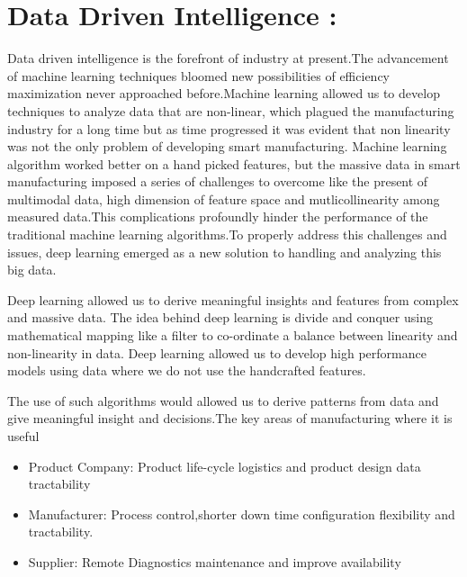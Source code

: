 \documentclass{article}
\begin{document}
\begin{normalsize}
\begin{itemize}
				\end{itemize}
	
	
       \section{Data Driven Intelligence :}
       		Data driven intelligence is the forefront of industry at present.The advancement of machine learning techniques bloomed new possibilities of efficiency maximization never approached before.Machine learning allowed us to develop techniques to analyze data that are non-linear, which plagued the manufacturing industry for a long time but as time progressed it was evident that non linearity was not the only problem of developing smart manufacturing. Machine learning algorithm worked better on a hand picked features, but the massive data in smart manufacturing imposed a series of challenges to overcome like the present of multimodal data, high dimension of feature space and mutlicollinearity among measured data.This complications profoundly hinder the performance of the traditional machine learning algorithms.To properly address this challenges and issues, deep learning emerged as a new solution to handling and analyzing this big data.
       		
       		Deep learning allowed us to derive meaningful insights and features from complex and massive data. The idea behind deep learning is divide and conquer using mathematical mapping like a filter to co-ordinate a balance between linearity and non-linearity in data. Deep learning allowed us to develop high performance models using data where we do not use the handcrafted features.
       		
        	The use of such algorithms would allowed us to derive patterns from data and give meaningful insight and decisions.The key areas of manufacturing where it is useful
        	   
             \begin{itemize}
        
\item{ Product Company: Product life-cycle logistics and product design data tractability }
\item{ Manufacturer: Process control,shorter down time configuration flexibility and tractability.
} 
\item{ Supplier: Remote Diagnostics maintenance and improve availability }



        \end{itemize}
        

\end{normalsize}
\end{document}
